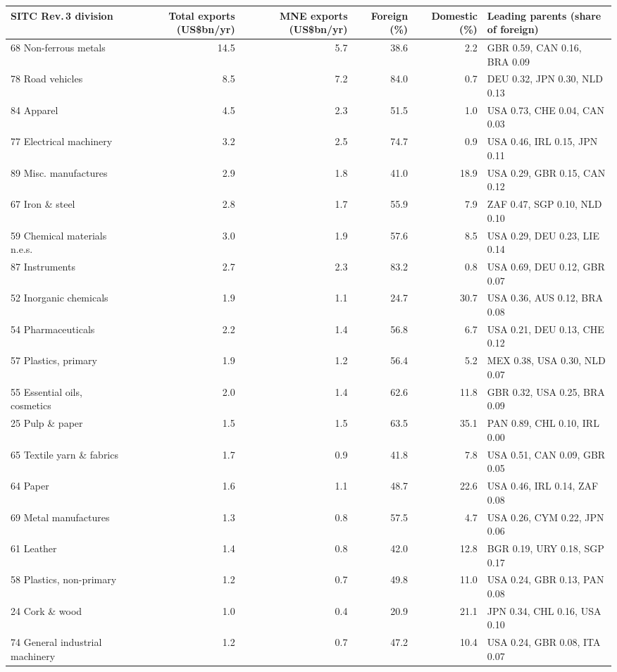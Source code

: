 \begin{tabular}{@{}l r r r r l@{}}
\toprule
SITC Rev.\,3 division & Total exports (US\$bn/yr) & MNE exports (US\$bn/yr) & Foreign (\%) & Domestic (\%) & Leading parents (share of foreign) \\
\midrule
68 Non-ferrous metals & 14.5 & 5.7 & 38.6 & 2.2 & GBR 0.59, CAN 0.16, BRA 0.09 \\
78 Road vehicles & 8.5 & 7.2 & 84.0 & 0.7 & DEU 0.32, JPN 0.30, NLD 0.13 \\
84 Apparel & 4.5 & 2.3 & 51.5 & 1.0 & USA 0.73, CHE 0.04, CAN 0.03 \\
77 Electrical machinery & 3.2 & 2.5 & 74.7 & 0.9 & USA 0.46, IRL 0.15, JPN 0.11 \\
89 Misc. manufactures & 2.9 & 1.8 & 41.0 & 18.9 & USA 0.29, GBR 0.15, CAN 0.12 \\
67 Iron \& steel & 2.8 & 1.7 & 55.9 & 7.9 & ZAF 0.47, SGP 0.10, NLD 0.10 \\
59 Chemical materials n.e.s. & 3.0 & 1.9 & 57.6 & 8.5 & USA 0.29, DEU 0.23, LIE 0.14 \\
87 Instruments & 2.7 & 2.3 & 83.2 & 0.8 & USA 0.69, DEU 0.12, GBR 0.07 \\
52 Inorganic chemicals & 1.9 & 1.1 & 24.7 & 30.7 & USA 0.36, AUS 0.12, BRA 0.08 \\
54 Pharmaceuticals & 2.2 & 1.4 & 56.8 & 6.7 & USA 0.21, DEU 0.13, CHE 0.12 \\
57 Plastics, primary & 1.9 & 1.2 & 56.4 & 5.2 & MEX 0.38, USA 0.30, NLD 0.07 \\
55 Essential oils, cosmetics & 2.0 & 1.4 & 62.6 & 11.8 & GBR 0.32, USA 0.25, BRA 0.09 \\
25 Pulp \& paper & 1.5 & 1.5 & 63.5 & 35.1 & PAN 0.89, CHL 0.10, IRL 0.00 \\
65 Textile yarn \& fabrics & 1.7 & 0.9 & 41.8 & 7.8 & USA 0.51, CAN 0.09, GBR 0.05 \\
64 Paper & 1.6 & 1.1 & 48.7 & 22.6 & USA 0.46, IRL 0.14, ZAF 0.08 \\
69 Metal manufactures & 1.3 & 0.8 & 57.5 & 4.7 & USA 0.26, CYM 0.22, JPN 0.06 \\
61 Leather & 1.4 & 0.8 & 42.0 & 12.8 & BGR 0.19, URY 0.18, SGP 0.17 \\
58 Plastics, non-primary & 1.2 & 0.7 & 49.8 & 11.0 & USA 0.24, GBR 0.13, PAN 0.08 \\
24 Cork \& wood & 1.0 & 0.4 & 20.9 & 21.1 & JPN 0.34, CHL 0.16, USA 0.10 \\
74 General industrial machinery & 1.2 & 0.7 & 47.2 & 10.4 & USA 0.24, GBR 0.08, ITA 0.07 \\

\end{tabular}
